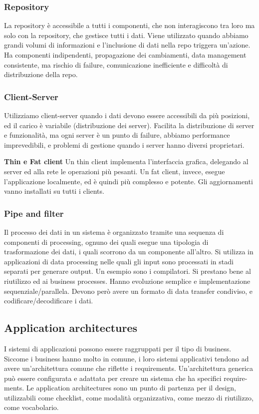 \documentclass{article}
\begin{document}
\subsubsection{Repository}

La repository è accessibile a tutti i componenti, che non interagiscono tra loro ma solo con la repository,
che gestisce tutti i dati. Viene utilizzato quando abbiamo grandi volumi di informazioni e l’inclusione
di dati nella repo triggera un'azione. Ha componenti indipendenti, propagazione dei cambiamenti, data
management consistente, ma rischio di failure, comunicazione inefficiente e difficoltà di distribuzione della
repo.

\subsubsection{Client-Server}

Utilizziamo client-server quando i dati devono essere accessibili da più posizioni, ed il carico è variabile
(distribuzione dei server). Facilita la distribuzione di server e funzionalità, ma ogni server è un punto di
failure, abbiamo performance imprevedibili, e problemi di gestione quando i server hanno diversi proprietari.

\textbf{Thin e Fat client} Un thin client implementa l'interfaccia grafica, delegando al server ed alla rete le
operazioni più pesanti. Un fat client, invece, esegue l'applicazione localmente, ed è quindi più complesso e
potente. Gli aggiornamenti vanno installati su tutti i clients.


\subsubsection{Pipe and filter}
Il processo dei dati in un sistema è organizzato tramite una sequenza di componenti di processing, ognuno
dei quali esegue una tipologia di trasformazione dei dati, i quali scorrono da un componente all’altro.
Si utilizza in applicazioni di data processing nelle quali gli input sono processati in stadi separati per
generare output. Un esempio sono i compilatori. Si prestano bene al riutilizzo ed ai business processes.
Hanno evoluzione semplice e implementazione sequenziale/parallela. Devono però avere un formato di data
transfer condiviso, e codificare/decodificare i dati.

\subsection{Application architectures}
I sistemi di applicazioni possono essere raggruppati per il tipo di business. Siccome i business hanno molto
in comune, i loro sistemi applicativi tendono ad avere un'architettura comune che riflette i requirements.
Un'architettura generica può essere configurata e adattata per creare un sistema che ha specifici require-
ments. Le application architectures sono un punto di partenza per il design, utilizzabili come checklist,
come modalità organizzativa, come mezzo di riutilizzo, come vocabolario.
\end{document}
